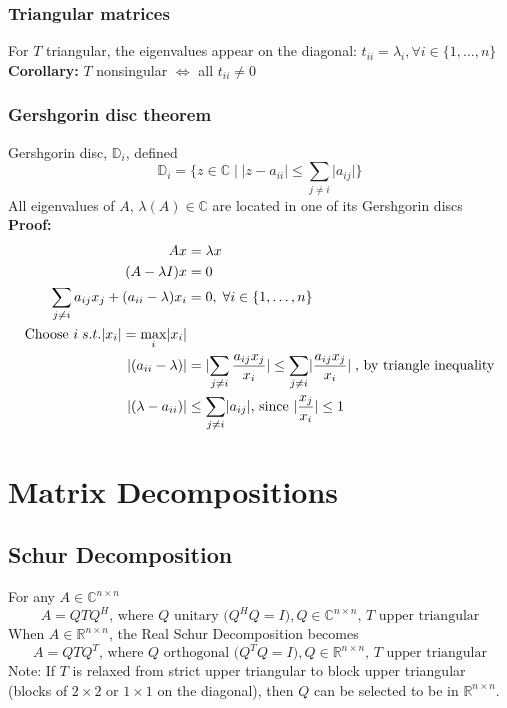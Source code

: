 \documentclass{article}
\begin{document}
\subsubsection{Triangular matrices}
For $T$ triangular, the eigenvalues appear on the diagonal: $t_{ii} = \lambda_i, \forall i \in \{1,\dots, n\}$\\
\textbf{Corollary:} $T$ nonsingular $\Leftrightarrow$ all $t_{ii} \neq 0$

\subsubsection{Gershgorin disc theorem}
Gershgorin disc, $\mathbb{D}_i$, defined
\begin{equation*}
    \mathbb{D}_i = \{z \in \mathbb{C} \mid \lvert z - a_{ii}\rvert \leq \sum_{j \neq i} \lvert a_{ij}\rvert\}
\end{equation*}
All eigenvalues of $A$, $\lambda(A) \in \mathbb{C}$ are located in one of its Gershgorin discs\\
\textbf{Proof:}
\begin{align*}
    Ax &= \lambda x \\
    (A - \lambda I)x &= 0\\
    \sum_{j \neq i} a_{ij}x_j + (a_{ii} - \lambda)x_i &= 0, \; \forall \space i \in \{1, \dots, n\}\\
    \textrm{Choose } i \; s.t. \lvert x_i\rvert  = \max_{i} \lvert x_i \rvert  \\
    \lvert (a_{ii} - \lambda) \rvert &= \lvert \sum_{j \neq i} \frac{a_{ij}x_j}{x_i}\rvert
    \leq \sum_{j \neq i} \lvert \frac{a_{ij}x_j}{x_i}\rvert \; \textrm{, by triangle inequality}\\
    \lvert (\lambda - a_{ii}) \rvert &\leq \sum_{j \neq i} \lvert a_{ij}\rvert 
    \textrm{, since $\lvert \frac{x_j}{x_i} \rvert \leq 1$}
\end{align*}

\section{Matrix Decompositions}
\subsection{Schur Decomposition}
For any $A \in \mathbb{C}^{n \times n}$
\begin{equation*}
    A = QTQ^H \textrm{, where $Q$ unitary ($Q^HQ = I), Q \in \mathbb{C}^{n \times n}$, $T$ upper triangular}
\end{equation*}
When $A \in \mathbb{R}^{n \times n}$, the Real Schur Decomposition becomes
\begin{equation*}
    A = QTQ^T \textrm{, where $Q$ orthogonal ($Q^TQ = I), Q \in \mathbb{R}^{n \times n}$, $T$ upper triangular}
\end{equation*}
Note: If $T$ is relaxed from strict upper triangular to block upper triangular (blocks of $2\times 2$ or $1 \times 1$ on the diagonal), then $Q$ can be selected to be in $\mathbb{R}^{n\times n}$.
\end{document}
